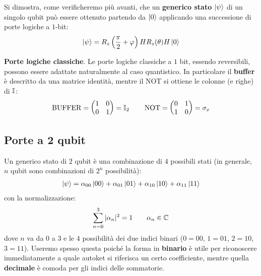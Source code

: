 \documentclass[../../InformazioneQuantistica.tex]{subfiles}
\begin{document}


Si dimostra, come verificheremo più avanti, che un \textbf{generico stato} $\Ket{\psi}$ di un singolo qubit può essere ottenuto partendo da $\Ket{0}$ applicando una successione di porte logiche a $1$-bit:
\begin{align*}
\Ket{\psi} = R_z\left(\frac{\pi}{2} + \varphi\right) H R_z(\theta) H \Ket{0}
\end{align*}

\begin{expl}
\textbf{Porte logiche classiche}. Le porte logiche classiche a $1$ bit, essendo reversibili, possono essere adattate naturalmente al caso quantistico. In particolare il \textbf{buffer} è descritto da una matrice identità, mentre il NOT si ottiene  le colonne (e righe) di $\mathbb{I}$:
\begin{align*}
    \operatorname{BUFFER} = \begin{pmatrix}
    1 & 0\\
    0 & 1
    \end{pmatrix} = \mathbb{I}_2 \qquad \operatorname{NOT} = \begin{pmatrix}
    0 & 1\\
    1 & 0
    \end{pmatrix} = \sigma_x
\end{align*}
\end{expl}

\subsection{Porte a 2 qubit}
Un generico stato di $2$ qubit è una combinazione di $4$ possibili stati (in generale, $n$ qubit sono combinazioni di $2^n$ possibilità):
\begin{align*}
\Ket{\psi} = \alpha_{00}\Ket{00} + \alpha_{01}\Ket{01} + \alpha_{10}\Ket{10} + \alpha_{11} \Ket{11}
\end{align*}
con la normalizzazione:
\begin{align*}
\sum_{n=0}^3 |\alpha_n|^2 = 1 \qquad \alpha_{n} \in \mathbb{C}
\end{align*}
dove $n$ va da $0$ a $3$ e  le $4$ possibilità dei due indici binari ($0=00$, $1=01$, $2=10$, $3=11$). Useremo spesso questa  poiché la forma in \textbf{binario} è utile per riconoscere immediatamente a quale autoket si riferisca un certo coefficiente, mentre quella \textbf{decimale} è comoda per gli indici delle sommatorie.\\
\end{document}
